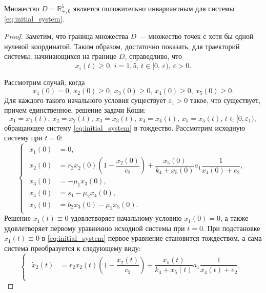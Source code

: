 \documentclass[14pt,a4paper]{extarticle}
\begin{document}
	\begin{theorem}
		Множество $D=\mathbb{R}^5_{+,0}$ является положительно инвариантным для системы \ref{eq:initial_system}.
	\end{theorem}
	\begin{proof}
		Заметим, что граница множества $D$ --- множество точек с хотя бы одной нулевой координатой. Таким образом, достаточно показать, для траекторий системы, начинающихся на границе $D$, справедливо, что 
		\[x_i(t)\ge0,\, i=\overline{1,5},\, t\in[0,\,\varepsilon),\,\varepsilon>0.\]
		
		
		
		Рассмотрим случай, когда
		\begin{equation}\label{eq:conds_1}
			x_1(0)=0,\, x_2(0)\ge0,\, x_3(0)\ge0,\, x_4(0)\ge0,\, x_5(0)\ge0.
		\end{equation}
		Для каждого такого начального условия существует $\varepsilon_1>0$ такое, что существует, причем единственное, решение задачи Коши: 
		\[x_1=x_1(t),\, x_2=x_2(t),\, x_3=x_3(t),\, x_4=x_4(t),\, x_5=x_5(t),\, t\in[0,\varepsilon_1),\]
		обращающее систему \ref{eq:initial_system} в тождество. Рассмотрим исходную систему при $t=0$:
		\begin{equation*}
			\begin{cases}
				\begin{aligned}
					\dot{x}_1(0) &= 0,\\
					\dot{x}_2(0) &= r_2x_2(0)\left(1-\dfrac{x_2(0)}{c_2}\right)+\dfrac{x_5(0)}{k_4+x_5(0)}a_1\dfrac{1}{x_4(0)+e_2},\\
					\dot{x}_3(0) &= -\mu_1x_3(0),\\
					\dot{x}_4(0) &= s_1 - \mu_2x_4(0),\\
					\dot{x}_5(0) &= b_2x_3(0) - \mu_3x_5(0).
				\end{aligned}
			\end{cases}
		\end{equation*}
		Решение $x_1(t)\equiv0$ удовлетворяет начальному условию $x_1(0)=0$, а также удовлетворяет первому уравнению исходной системы при $t=0$. При подстановке $x_1(t)\equiv0$ в \ref{eq:initial_system} первое уравнение становится тождеством, а сама система преобразуется к следующему виду:
		\begin{equation*}
			\begin{cases}
				\begin{aligned}
					\dot{x}_2(t) &= r_2x_2(t)\left(1-\dfrac{x_2(t)}{c_2}\right)+\dfrac{x_5(t)}{k_4+x_5(t)}a_1\dfrac{1}{x_4(t)+e_2},\\

\end{aligned}
\end{cases}
\end{equation*}
\end{proof}
\end{document}
